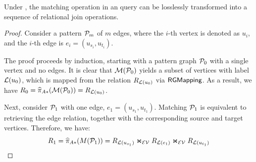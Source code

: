 \begin{lemma}
    \label{lem:spjm-to-spj}
    Under \rgmapping, the matching operation in an \spjm query can be losslessly transformed into a sequence of relational join operations.
\end{lemma}
\begin{proof}
    Consider a pattern $\mathcal{P}_m$ of $m$ edges, where the $i$-th vertex is denoted as $u_i$, and the $i$-th edge is $e_i = (u_{s_i}, u_{t_i})$. %

The proof proceeds by induction, starting with a pattern graph $\mathcal{P}_0$ with a single vertex and no edges. It is clear that $\mathcal{M}(\mathcal{P}_0)$ yields a subset of vertices with label $\mathcal{L}(u_0)$, which is mapped from the relation ${R_{\mathcal{L}(u_0)}}$ via ${\mathsf{RGMapping}}$. As a result, we have $R_0 = \widehat{\pi}_{A*}(\mathcal{M}(\mathcal{P}_0)) = {R_{\mathcal{L}(u_0)}}$.

Next, consider $\mathcal{P}_1$ with one edge, $e_1 = (u_{s_1}, u_{t_1})$. Matching $\mathcal{P}_1$ is equivalent to retrieving the edge relation, together with the corresponding source and target vertices. Therefore, we have:
\[ R_1 = \widehat{\pi}_{A*}(M(\mathcal{P}_1)) = {R_{\mathcal{L}(u_{s_1})}} \Join_\mathcal{EV} {R_{\mathcal{L}(e_1)}} \Join_\mathcal{EV} {R_{\mathcal{L}(u_{t_1})}} \]


\end{proof}
